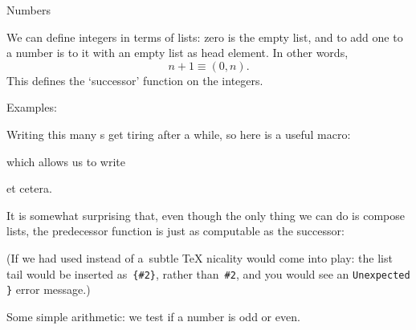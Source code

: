  {Numbers}

We can define integers in terms of lists: zero is the empty list, and
to add one to a number is to  it with an empty list as head
element. In other words, \[n+1\equiv(0,n).\]
This defines the `successor' function on the integers.
\begin{inputwithcode}
\let\Zero\Nil
\def\AddOne#1{\Cons\Nil{#1}}
\end{inputwithcode}
Examples:
\begin{logix}
\end{logix}

Writing this many s get tiring after a while, so here is a
useful macro:
\begin{inputwithcode}
\newtoks\dtoks\newcount\nn
\def\ndef#1#2{\nn=#2 \dtoks={\Zero}\nndef#1}
\def\nndef#1{
  \ifnum\nn=0 \edef\tmp{\def\noexpand#1{\the\dtoks}}\tmp
  \else \edef\tmp{\dtoks={\noexpand\AddOne{\the\dtoks}}}\tmp
        \advance\nn by -1 \nndef#1
  \fi}
\end{inputwithcode}
which allows us to write
\begin{inputwithcode}
\ndef{} \ndef{} \ndef{} \ndef{} \ndef{}
\ndef{}\ndef{}
\end{inputwithcode}
et cetera.

It is somewhat surprising that, even though the only thing we can do
is compose lists, the predecessor function is just as computable as
the successor:
\begin{inputwithcode}
\def\SubOne#1{#1\Second\Error}
\end{inputwithcode}
\begin{logix}
\end{logix}
(If we had used  instead of  a~subtle \TeX
nicality would come into play: the list tail would be inserted
as~\verb+{#2}+, rather than~\verb+#2+, and you would see an
\verb+Unexpected }+ error message.)

Some simple arithmetic: we test if a number is odd or even.
\begin{inputwithcode}
\def\IsEven#1{#1\IsOddp\True}
\def\IsOddp#1#2{\IsOdd{#2}}
\def\IsOdd#1{#1\IsEvenp\False}
\def\IsEvenp#1#2{\IsEven{#2}}
\end{inputwithcode}
\begin{logixx}
\end{logixx}
\def\IsOne#1{#1\IsOnep\False}
\def\IsOnep#1{\IsZero}

